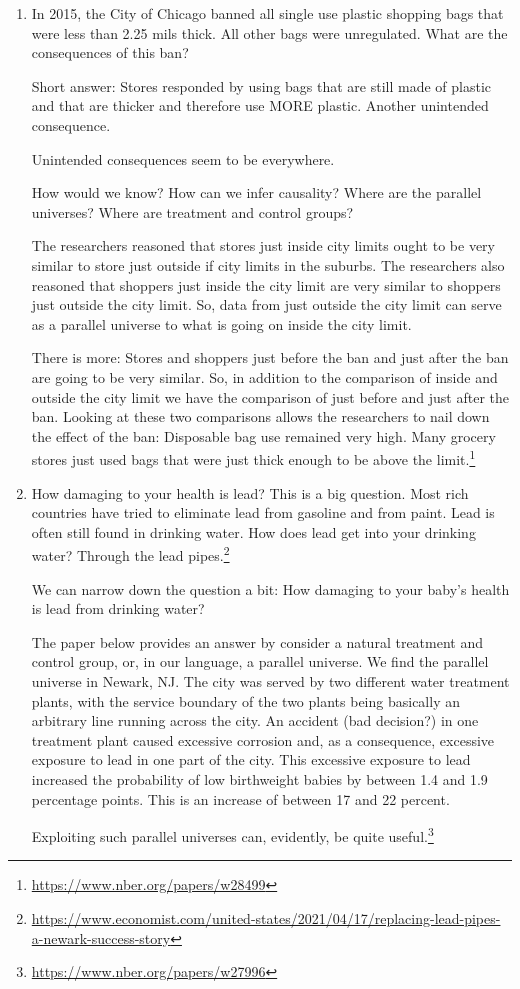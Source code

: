 \documentclass[
]{book}
\begin{document}
\begin{enumerate}
\def\labelenumi{\arabic{enumi}.}
\setcounter{enumi}{2}
\item
  In 2015, the City of Chicago banned all single use plastic shopping bags that were less than 2.25 mils thick. All other bags were unregulated. What are the consequences of this ban?

  Short answer: Stores responded by using bags that are still made of plastic and that are thicker and therefore use MORE plastic. Another unintended consequence.

  Unintended consequences seem to be everywhere.

  How would we know? How can we infer causality? Where are the parallel universes? Where are treatment and control groups?

  The researchers reasoned that stores just inside city limits ought to be very similar to store just outside if city limits in the suburbs. The researchers also reasoned that shoppers just inside the city limit are very similar to shoppers just outside the city limit. So, data from just outside the city limit can serve as a parallel universe to what is going on inside the city limit.

  There is more: Stores and shoppers just before the ban and just after the ban are going to be very similar. So, in addition to the comparison of inside and outside the city limit we have the comparison of just before and just after the ban. Looking at these two comparisons allows the researchers to nail down the effect of the ban: Disposable bag use remained very high. Many grocery stores just used bags that were just thick enough to be above the limit.\footnote{\url{https://www.nber.org/papers/w28499}}
\item
  How damaging to your health is lead? This is a big question. Most rich countries have tried to eliminate lead from gasoline and from paint. Lead is often still found in drinking water. How does lead get into your drinking water? Through the lead pipes.\footnote{\url{https://www.economist.com/united-states/2021/04/17/replacing-lead-pipes-a-newark-success-story}}

  We can narrow down the question a bit: How damaging to your baby's health is lead from drinking water?

  The paper below provides an answer by consider a natural treatment and control group, or, in our language, a parallel universe. We find the parallel universe in Newark, NJ. The city was served by two different water treatment plants, with the service boundary of the two plants being basically an arbitrary line running across the city. An accident (bad decision?) in one treatment plant caused excessive corrosion and, as a consequence, excessive exposure to lead in one part of the city. This excessive exposure to lead increased the probability of low birthweight babies by between 1.4 and 1.9 percentage points. This is an increase of between 17 and 22 percent.

  Exploiting such parallel universes can, evidently, be quite useful.\footnote{\url{https://www.nber.org/papers/w27996}}
\end{enumerate}
\end{document}
